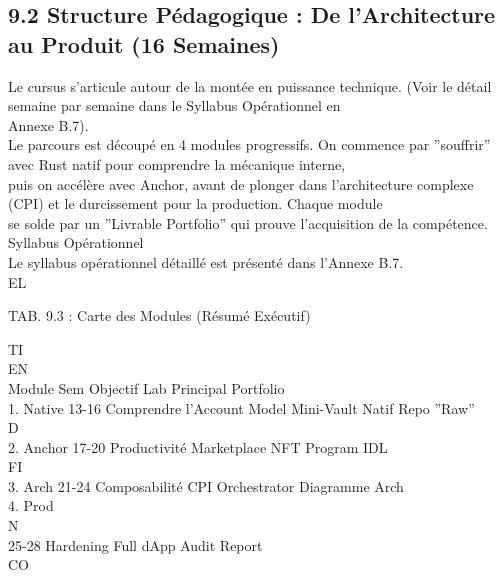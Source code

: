 \documentclass[12pt,landscape,a4paper]{article}
\begin{document}
\subsection{9.2 Structure Pédagogique : De l’Architecture au Produit (16 Semaines)}
Le cursus s’articule autour de la montée en puissance technique. (Voir le détail semaine par semaine dans le Syllabus Opérationnel en\\
Annexe B.7).\\
Le parcours est découpé en 4 modules progressifs. On commence par ”souffrir” avec Rust natif pour comprendre la mécanique interne,\\
puis on accélère avec Anchor, avant de plonger dans l’architecture complexe (CPI) et le durcissement pour la production. Chaque module\\
se solde par un ”Livrable Portfolio” qui prouve l’acquisition de la compétence.\\
\vspace{0.5em}
Syllabus Opérationnel\\
\vspace{0.5em}
Le syllabus opérationnel détaillé est présenté dans l’Annexe B.7.\\
\vspace{0.5em}
\vspace{0.5em}
\vspace{0.5em}
\vspace{0.5em}
EL\\
\begin{center}\begin{tabular}TAB. 9.3 : Carte des Modules (Résumé Exécutif)\end{tabular}\end{center}
\vspace{0.5em}
\vspace{0.5em}
\vspace{0.5em}
\vspace{0.5em}
TI\\
EN\\
Module Sem Objectif                        Lab Principal    Portfolio\\
1. Native 13-16 Comprendre l’Account Model Mini-Vault Natif Repo ”Raw”\\
\vspace{0.5em}
\vspace{0.5em}
\vspace{0.5em}
\vspace{0.5em}
D\\
2. Anchor 17-20 Productivité               Marketplace NFT Program IDL\\
\vspace{0.5em}
\vspace{0.5em}
\vspace{0.5em}
\vspace{0.5em}
FI\\
3. Arch   21-24 Composabilité              CPI Orchestrator Diagramme Arch\\
4. Prod\\
N\\
25-28 Hardening                  Full dApp        Audit Report\\
CO\\
\vspace{0.5em}
\end{document}
